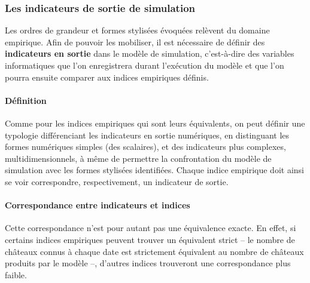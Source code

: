 
\subsubsection{Les indicateurs de sortie de simulation}


Les ordres de grandeur et formes stylisées évoquées relèvent du domaine empirique.
Afin de pouvoir les mobiliser, il est nécessaire de définir des \textbf{indicateurs en sortie} dans le modèle de simulation, c'est-à-dire des variables informatiques que l'on enregistrera durant l'exécution du modèle et que l'on pourra ensuite comparer aux indices empiriques définis.


\paragraph{Définition}
Comme pour les indices empiriques qui sont leurs équivalents, on peut définir une typologie différenciant les indicateurs en sortie \og numériques\fg{}, en distinguant les formes numériques simples (des scalaires), et des indicateurs plus complexes, multidimensionnels, à même de permettre la confrontation du modèle de simulation avec les formes stylisées identifiées.
Chaque indice empirique doit ainsi se voir correspondre, respectivement, un indicateur de sortie.

\paragraph{Correspondance entre indicateurs et indices}\label{para:correspondance}

Cette correspondance n'est pour autant pas une équivalence exacte.
En effet, si certains indices empiriques peuvent trouver un équivalent strict -- le nombre de châteaux connus à chaque date est strictement équivalent au nombre de châteaux produits par le modèle --, d'autres indices trouveront une correspondance plus faible.


